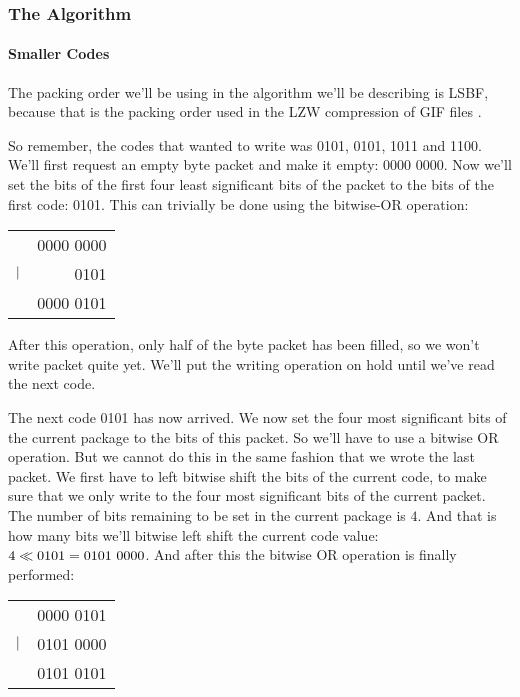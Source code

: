 \begin{refsection}
\subsubsection{The Algorithm}

\paragraph{Smaller Codes}

The packing order we'll be using in the algorithm we'll be describing is LSBF,
because that is the packing order used in the LZW compression of GIF
files \cite{gif89a}.

So remember, the codes that wanted to write was 0101, 0101, 1011 and
1100. We'll first request an empty byte packet and make it empty:
0000 0000. Now we'll set the bits of the first four least
significant bits of the packet to the bits of the first code:
0101. This can trivially be done using the bitwise-OR operation:

\begin{center}
  \begin{tabular}{lr}
    & 0000 0000  \\
    $\mathrel{|}$ & 0101 \\
    \hline
    & 0000 0101 \\
  \end{tabular}
\end{center}

After this operation, only half of the byte packet has been filled, so
we won't write packet quite yet. We'll put the writing operation on
hold until we've read the next code.

The next code 0101 has now arrived. We now set the four most
significant bits of the current package to the bits of this packet. So
we'll have to use a bitwise OR operation. But we cannot do this in the
same fashion that we wrote the last packet. We first have to left
bitwise shift the bits of the current code, to make sure that we only
write to the four most significant bits of the current packet. The
number of bits remaining to be set in the current package is $4$. And
that is how many bits we'll bitwise left shift the current code value:
$4 \ShiftLeft 0101 = 0101\ 0000$. And after this the bitwise OR
operation is finally performed:

\begin{center}
  \begin{tabular}{lr}
    & 0000 0101  \\
    $\mathrel{|}$ & 0101 0000 \\
    \hline
    & 0101 0101 \\
  \end{tabular}
\end{center}


\end{refsection}
